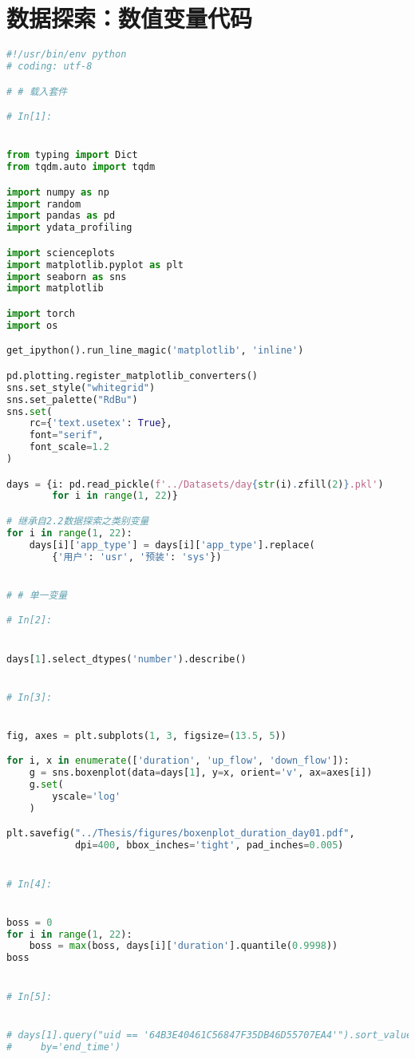 \documentclass[withoutpreface,bwprint]{cumcmthesis}
\begin{document}
\begin{appendices}
\begin{lstlisting}[language=Python]
    \end{lstlisting}

    \section{数据探索：数值变量代码}
    \begin{lstlisting}[language=Python]
#!/usr/bin/env python
# coding: utf-8

# # 载入套件

# In[1]:


from typing import Dict
from tqdm.auto import tqdm

import numpy as np
import random
import pandas as pd
import ydata_profiling

import scienceplots
import matplotlib.pyplot as plt
import seaborn as sns
import matplotlib

import torch
import os

get_ipython().run_line_magic('matplotlib', 'inline')

pd.plotting.register_matplotlib_converters()
sns.set_style("whitegrid")
sns.set_palette("RdBu")
sns.set(
    rc={'text.usetex': True},
    font="serif",
    font_scale=1.2
)

days = {i: pd.read_pickle(f'../Datasets/day{str(i).zfill(2)}.pkl')
        for i in range(1, 22)}

# 继承自2.2数据探索之类别变量
for i in range(1, 22):
    days[i]['app_type'] = days[i]['app_type'].replace(
        {'用户': 'usr', '预装': 'sys'})


# # 单一变量

# In[2]:


days[1].select_dtypes('number').describe()


# In[3]:


fig, axes = plt.subplots(1, 3, figsize=(13.5, 5))

for i, x in enumerate(['duration', 'up_flow', 'down_flow']):
    g = sns.boxenplot(data=days[1], y=x, orient='v', ax=axes[i])
    g.set(
        yscale='log'
    )

plt.savefig("../Thesis/figures/boxenplot_duration_day01.pdf",
            dpi=400, bbox_inches='tight', pad_inches=0.005)


# In[4]:


boss = 0
for i in range(1, 22):
    boss = max(boss, days[i]['duration'].quantile(0.9998))
boss


# In[5]:


# days[1].query("uid == '64B3E40461C56847F35DB46D55707EA4'").sort_values(
#     by='end_time')



\end{lstlisting}
\end{appendices}
\end{document}

